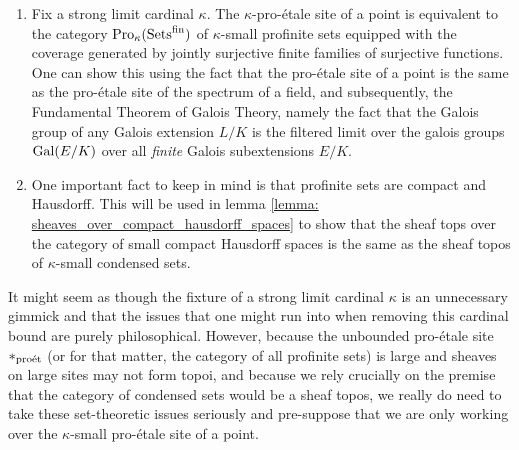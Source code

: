             \begin{remark} \label{remark: condensation_and_profiniteness}
                \noindent
                \begin{enumerate}
                    \item Fix a strong limit cardinal $\kappa$. The $\kappa$-pro-\'etale site of a point is equivalent to the category $\mathrm{Pro}_{\kappa}(\mathrm{Sets}^{\mathrm{fin}})$ of $\kappa$-small profinite sets equipped with the coverage generated by jointly surjective finite families of surjective functions. One can show this using the fact that the pro-\'etale site of a point is the same as the pro-\'etale site of the spectrum of a field, and subsequently, the Fundamental Theorem of Galois Theory, namely the fact that the Galois group of any Galois extension $L/K$ is the filtered limit over the galois groups $\mathrm{Gal}(E/K)$ over all \textit{finite} Galois subextensions $E/K$.
                    \item One important fact to keep in mind is that profinite sets are compact and Hausdorff. This will be used in lemma \ref{lemma: sheaves_over_compact_hausdorff_spaces} to show that the sheaf tops over the category of small compact Hausdorff spaces is the same as the sheaf topos of $\kappa$-small condensed sets.
                \end{enumerate}
            \end{remark}
            \begin{remark} \label{remark: condensed_sets_set_theoretic_issues}
                It might seem as though the fixture of a strong limit cardinal $\kappa$ is an unnecessary gimmick and that the issues that one might run into when removing this cardinal bound are purely philosophical. However, because the unbounded pro-\'etale site $*_{\mathrm{pro\acute{e}t}}$ (or for that matter, the category of all profinite sets) is large and sheaves on large sites may not form topoi, and because we rely crucially on the premise that the category of condensed sets would be a sheaf topos, we really do need to take these set-theoretic issues seriously and pre-suppose that we are only working over the $\kappa$-small pro-\'etale site of a point.
            \end{remark}
            
